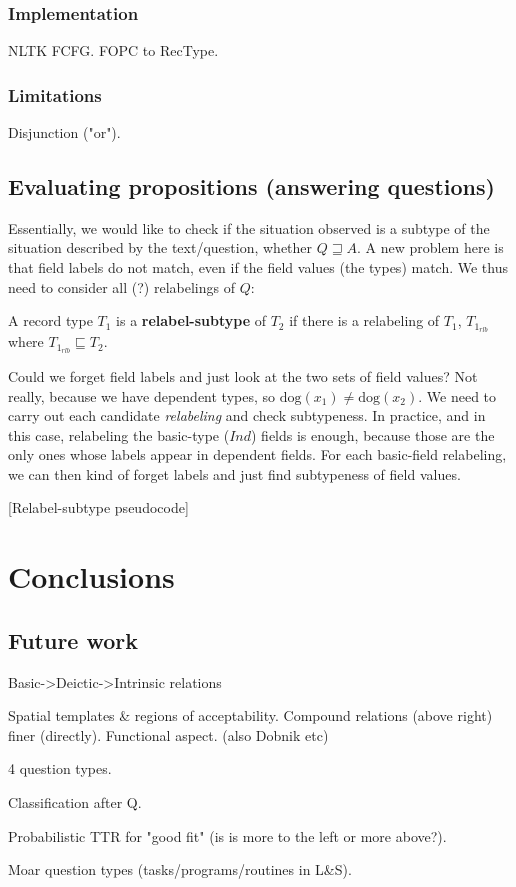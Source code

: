 \documentclass[11pt, a4paper]{article}
\begin{document}
\subsubsection{Implementation}

NLTK FCFG.
FOPC to RecType.

\subsubsection{Limitations}

Disjunction ("or").


\subsection{Evaluating propositions (answering questions)}

Essentially, we would like to check if the situation observed is a subtype of the situation described by the text/question, whether $Q \sqsupseteq A$. A new problem here is that field labels do not match, even if the field values (the types) match. We thus need to consider all (?) relabelings of $Q$:

A record type $T_1$ is a \textbf{relabel-subtype} of $T_2$ if there is a relabeling of $T_1$, $T_{1_{rlb}}$ where $T_{1_{rlb}} \sqsubseteq T_2$.

Could we forget field labels and just look at the two sets of field values? Not really, because we have dependent types, so $\text{dog}(x_1) ≠ \text{dog}(x_2)$. We need to carry out each candidate \textit{relabeling} and check subtypeness. In practice, and in this case, relabeling the basic-type ($Ind$) fields is enough, because those are the only ones whose labels appear in dependent fields. For each basic-field relabeling, we can then kind of forget labels and just find subtypeness of field values.

[Relabel-subtype pseudocode]

\section{Conclusions}

\subsection{Future work}

Basic->Deictic->Intrinsic relations  \cite{LoganComputationalAnalysisApprehension1996}

Spatial templates \& regions of acceptability. Compound relations (above right) finer (directly). Functional aspect.  \cite{LoganComputationalAnalysisApprehension1996} (also Dobnik etc)

4 question types.

Classification after Q.

Probabilistic TTR for "good fit" (is is more to the left or more above?).

Moar question types (tasks/programs/routines in L\&S).


\end{document}
